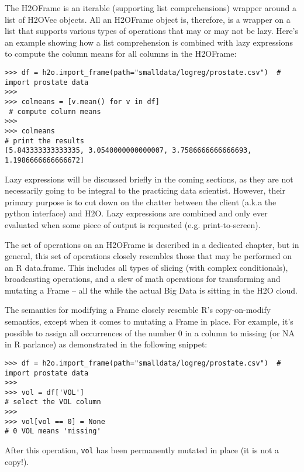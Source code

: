 The H2OFrame is an iterable (supporting list comprehensions) wrapper around a list of H2OVec objects. All an H2OFrame object is, therefore, is a wrapper on a list that supports various types of operations that may or may not be lazy. Here's an example showing how a list comprehension is combined with lazy expressions to compute the column means for all columns in the H2OFrame:

\begin{lstlisting}[style=python]
>>> df = h2o.import_frame(path="smalldata/logreg/prostate.csv")  # import prostate data
>>>
>>> colmeans = [v.mean() for v in df]                           
 # compute column means
>>>
>>> colmeans                                                     
# print the results
[5.843333333333335, 3.0540000000000007, 3.7586666666666693, 1.1986666666666672]
\end{lstlisting}

Lazy expressions will be discussed briefly in the coming sections, as they are not necessarily going to be integral to the practicing data scientist. However, their primary purpose is to cut down on the chatter between the client (a.k.a the python interface) and H2O. Lazy expressions are combined and only ever evaluated when some piece of output is requested (e.g. print-to-screen).

The set of operations on an H2OFrame is described in a dedicated chapter, but in general, this set of operations closely resembles those that may be performed on an R data.frame. This includes all types of slicing (with complex conditionals), broadcasting operations, and a slew of math operations for transforming and mutating a Frame -- all the while the actual Big Data is sitting in the H2O cloud. 

The semantics for modifying a Frame closely resemble R's copy-on-modify semantics, except when it comes to mutating a Frame in place. For example, it's possible to assign all occurrences of the number 0 in a column to missing (or NA in R parlance) as demonstrated in the following snippet:

\begin{lstlisting}[style=python]
>>> df = h2o.import_frame(path="smalldata/logreg/prostate.csv")  # import prostate data
>>>
>>> vol = df['VOL']                                              
# select the VOL column
>>>
>>> vol[vol == 0] = None                                         
# 0 VOL means 'missing'
\end{lstlisting}

After this operation, \texttt{vol} has been permanently mutated in place (it is not a copy!).

